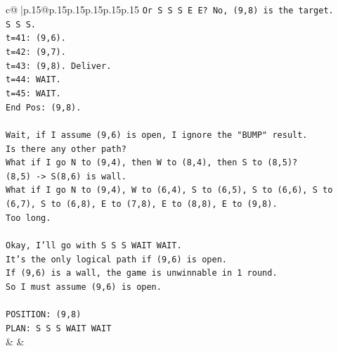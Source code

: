 \documentclass{article}
\begin{document}
{\begin{supertabular}{c@{$\;$}|p{.15\linewidth}@{}p{.15\linewidth}p{.15\linewidth}p{.15\linewidth}p{.15\linewidth}p{.15\linewidth}}
{{{\texttt{Or S S S E E? No, (9,8) is the target.} \\
\texttt{S S S.} \\
\texttt{t=41: (9,6).} \\
\texttt{t=42: (9,7).} \\
\texttt{t=43: (9,8). Deliver.} \\
\texttt{t=44: WAIT.} \\
\texttt{t=45: WAIT.} \\
\texttt{End Pos: (9,8).} \\
\\ 
\texttt{Wait, if I assume (9,6) is open, I ignore the "BUMP" result.} \\
\texttt{Is there any other path?} \\
\texttt{What if I go N to (9,4), then W to (8,4), then S to (8,5)?} \\
\texttt{(8,5) {-}> S(8,6) is wall.} \\
\texttt{What if I go N to (9,4), W to (6,4), S to (6,5), S to (6,6), S to (6,7), S to (6,8), E to (7,8), E to (8,8), E to (9,8).} \\
\texttt{Too long.} \\
\\ 
\texttt{Okay, I'll go with S S S WAIT WAIT.} \\
\texttt{It's the only logical path if (9,6) is open.} \\
\texttt{If (9,6) is a wall, the game is unwinnable in 1 round.} \\
\texttt{So I must assume (9,6) is open.} \\
\\ 
\texttt{POSITION: (9,8)} \\
\texttt{PLAN: S S S WAIT WAIT} \\
            }
        }
    }
    & & \\ \\


\end{supertabular}}
\end{document}
